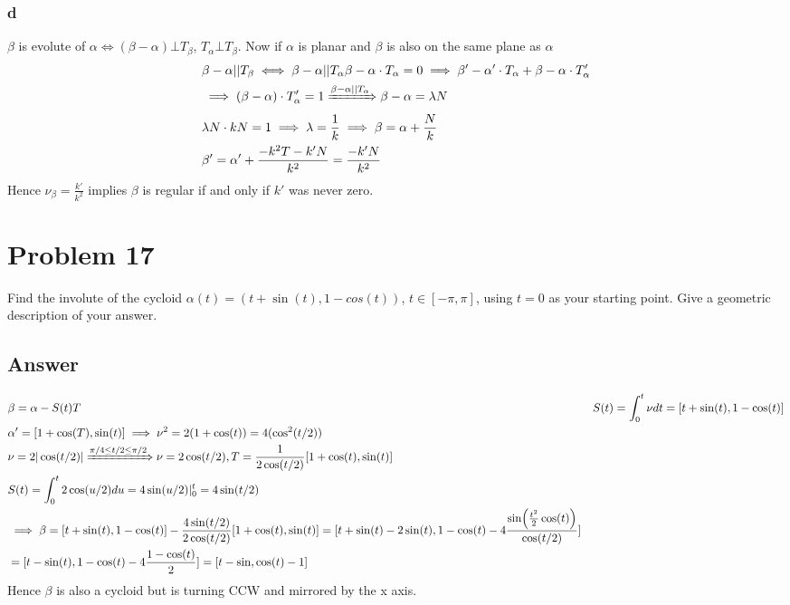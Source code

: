 \documentclass[
	12pt, %
]{fphw}
\theoremstyle{plain}
\begin{document}
\subsubsection*{d}
$\beta$ is evolute of $\alpha \iff (\beta-\alpha)\bot T_\beta$,  $T_\alpha\bot T_\beta$.
Now if $\alpha$ is planar and $\beta$ is also on the same plane as $\alpha$
\begin{align*}
&\beta - \alpha||T_\beta \iff \beta - \alpha||T_\alpha
\beta - \alpha\cdot T_\alpha=0 \implies \beta' - \alpha'\cdot T_\alpha+\beta - \alpha\cdot T'_\alpha\\
&\implies (\beta-\alpha)\cdot T'_\alpha=1 \xRightarrow{{\beta - \alpha||T_\alpha}} \beta-\alpha=\lambda N\\
&\lambda N\cdot kN=1 \implies \lambda=\frac{1}{k}\implies \beta=\alpha+\frac{N}{k}\\
&\beta'=\alpha'+\frac{-k^2T-k'N}{k^2}=\frac{-k'N}{k^2}
\end{align*}
Hence $\nu_\beta=\frac{k'}{k^2}$ implies $\beta$ is regular if and only if $k'$ was never zero.


\section*{Problem 17}
\begin{problem}
     Find the involute of the cycloid $\alpha(t) = (t+\sin(t),1 - cos(t) )$, $t \in [-\pi,\pi]$,  using $t = 0$ as your starting
     point. Give a geometric description of your answer.
\end{problem}
\subsection*{Answer}

\begin{align*}
     &\beta=\alpha-S(t)T
     &S(t)=\int_{0}^{t}\nu dt=[t+\sin(t),1-\cos(t)]\\
     &\alpha'=[1+\cos(T), \sin(t)]\implies\nu^2=2(1+\cos(t))=4(\cos^2(t/2))\\
     &\nu=2|\cos(t/2)|\xRightarrow{{\pi/4\leq t/2\leq \pi/2}} \nu=2\cos(t/2),T=\frac{1}{2\cos(t/2)}[1+\cos(t), \sin(t)]\\
     &S(t)=\int_{0}^{t}2\cos(u/2)du=4\sin(u/2)|_{0}^{t}=4\sin(t/2)\\
     &\implies \beta=[t+\sin(t),1-\cos(t)]-\frac{4\sin(t/2)}{2\cos(t/2)}[1+\cos(t), \sin(t)]=[t+\sin(t)-2\sin(t), 1-\cos(t)-4\frac{\sin(\frac{t^2}{2}\cos(t))}{\cos(t/2)}]\\
     &=[t-\sin(t), 1-\cos(t)-4\frac{1-\cos(t)}{2}]=[t-\sin, \cos(t)-1]
\end{align*}
Hence $\beta$ is also a cycloid but is turning CCW and mirrored by the x axis.
\end{document}
